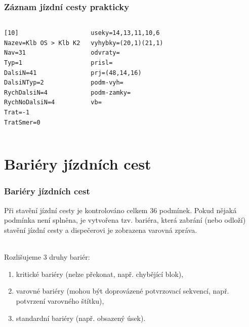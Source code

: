 \documentclass[czech]{beamer}
\begin{document}

\begin{frame}[fragile]
\frametitle{Záznam jízdní cesty prakticky}
\begin{example}
\begin{columns}[c]
\begin{verbatim}
[10]
Nazev=Klb OS > Klb K2
Nav=31
Typ=1
DalsiN=41
DalsiNTyp=2
RychDalsiN=4
RychNoDalsiN=4
Trat=-1
TratSmer=0
\end{verbatim}
\begin{verbatim}
useky=14,13,11,10,6
vyhybky=(20,1)(21,1)
odvraty=
prisl=
prj=(48,14,16)
podm-vyh=
podm-zamky=
vb=
\end{verbatim}
\end{columns}
\end{example}
\end{frame}

\section{Bariéry jízdních cest}

\begin{frame}
\frametitle{Bariéry jízdních cest}
Při stavění jízdní cesty je kontrolováno celkem 36 podmínek. Pokud nějaká
podmínka není splněna, je vytvořena tzv. bariéra, která zabrání (nebo odloží)
stavění jízdní cesty a dispečerovi je zobrazena varovná zpráva.

~\\

Rozlišujeme 3 druhy bariér:

\begin{enumerate}
\item kritické bariéry (nelze překonat, např. chybějící blok),
\item varovné bariéry (mohou být doprovázené potvrzovací sekvencí, např. potvrzení varovného štítku),
\item standardní bariéry (např. obsazený úsek).
\end{enumerate}

\end{frame}

\end{document}

